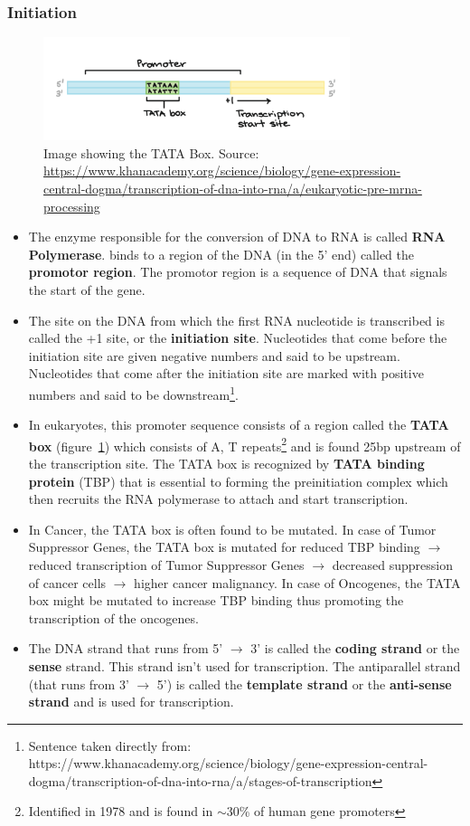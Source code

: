 \documentclass[letterpaper,12pt]{article}
\begin{document}
\subsubsection*{Initiation}
\begin{figure}[!h]
	\centering
	\includegraphics[width=0.8\textwidth]{figures/recognition_site.png}
	\caption{Image showing the TATA Box. Source: \url{https://www.khanacademy.org/science/biology/gene-expression-central-dogma/transcription-of-dna-into-rna/a/eukaryotic-pre-mrna-processing}}\label{fig:TATABOX}
\end{figure}
\begin{itemize}
	\item The enzyme responsible for the conversion of DNA to RNA is called \textbf{RNA Polymerase}. binds to a region of the DNA (in the 5' end) called the \textbf{promotor region}. The promotor region is a sequence of DNA that signals the start of the gene.
	\item The site on the DNA from which the first RNA nucleotide is transcribed is called the +1 site, or the \textbf{initiation site}. Nucleotides that come before the initiation site are given negative numbers and said to be upstream. Nucleotides that come after the initiation site are marked with positive numbers and said to be downstream\footnote{Sentence taken directly from: https://www.khanacademy.org/science/biology/gene-expression-central-dogma/transcription-of-dna-into-rna/a/stages-of-transcription}.
	\item In eukaryotes, this promoter sequence consists of a region called the \textbf{TATA box} (figure~\ref{fig:TATABOX}) which consists of A, T repeats\footnote{Identified in 1978 and is found in $\sim$30\% of human gene promoters} and is found 25bp upstream of the transcription site.
	      The TATA box is recognized by \textbf{TATA binding protein} (TBP) that is essential to forming the preinitiation complex which then recruits the RNA polymerase to attach and start transcription.
	\item In Cancer, the TATA box is often found to be mutated. In case of Tumor Suppressor Genes, the TATA box is mutated for reduced TBP binding $\longrightarrow$ reduced transcription of Tumor Suppressor Genes $\longrightarrow$ decreased suppression of cancer cells $\longrightarrow$ higher cancer malignancy. In case of Oncogenes, the TATA box might be mutated to increase TBP binding thus promoting the transcription of the oncogenes.
	\item The DNA strand that runs from 5' $\rightarrow$ 3' is called the \textbf{coding strand} or the \textbf{sense} strand. This strand isn't used for transcription. The antiparallel strand (that runs from 3' $\rightarrow$ 5') is called the \textbf{template strand} or the \textbf{anti-sense strand} and is used for transcription.
\end{itemize}
\end{document}
